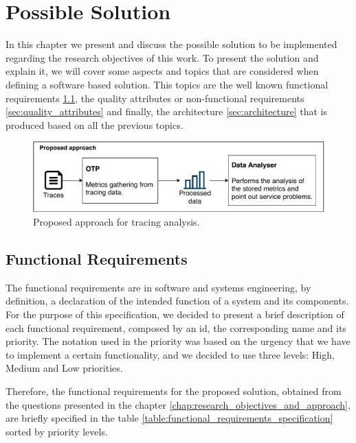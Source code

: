 \glsresetall
\chapter{Possible Solution}
\label{chap:possible_solution}

In this chapter we present and discuss the possible solution to be implemented regarding the research objectives of this work. To present the solution and explain it, we will cover some aspects and topics that are considered when defining a software based solution. This topics are the well known functional requirements \ref{sec:functional_requirements}, the quality attributes or non-functional requirements \ref{sec:quality_attributes} and finally, the architecture \ref{sec:architecture} that is produced based on all the previous topics.

\begin{figure}[H]
    \centering
    \includegraphics[width=1.00\textwidth]{images/proposed_solution.pdf}
    \caption{Proposed approach for tracing analysis.}
    \label{fig:proposed_approach_for_tracing_analysis}
\end{figure}

\section{Functional Requirements}
\label{sec:functional_requirements}

The functional requirements are in software and systems engineering, by definition, a declaration of the intended function of a system and its components. For the purpose of this specification, we decided to present a brief description of each functional requirement, composed by an id, the corresponding name and its priority. The notation used in the priority was based on the urgency that we have to implement a certain functionality, and we decided to use three levels: High, Medium and Low priorities.

Therefore, the functional requirements for the proposed solution, obtained from the questions presented in the chapter \ref{chap:research_objectives_and_approach}, are briefly specified in the table \ref{table:functional_requirements_specification} sorted by priority levels.

